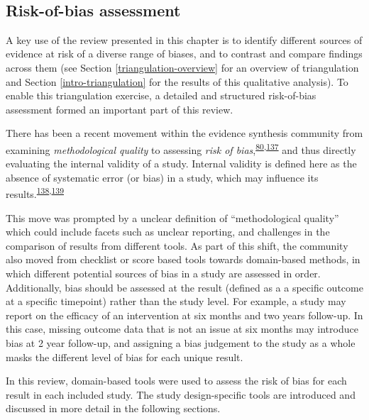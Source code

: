 \documentclass[a4paper, twoside]{templates/ociamthesis}
\begin{document}
~

\hypertarget{risk-of-bias}{%
\subsection{Risk-of-bias assessment}\label{risk-of-bias}}

A key use of the review presented in this chapter is to identify different sources of evidence at risk of a diverse range of biases, and to contrast and compare findings across them (see Section \ref{triangulation-overview} for an overview of triangulation and Section \ref{intro-triangulation} for the results of this qualitative analysis). To enable this triangulation exercise, a detailed and structured risk-of-bias assessment formed an important part of this review.

There has been a recent movement within the evidence synthesis community from examining \emph{methodological quality} to assessing \emph{risk of bias},\textsuperscript{\protect\hyperlink{ref-mcguinness2018}{80},\protect\hyperlink{ref-sterne2016}{137}} and thus directly evaluating the internal validity of a study. Internal validity is defined here as the absence of systematic error (or bias) in a study, which may influence its results.\textsuperscript{\protect\hyperlink{ref-campbell1957}{138},\protect\hyperlink{ref-juni2001}{139}}

This move was prompted by a unclear definition of ``methodological quality'' which could include facets such as unclear reporting, and challenges in the comparison of results from different tools. As part of this shift, the community also moved from checklist or score based tools towards domain-based methods, in which different potential sources of bias in a study are assessed in order. Additionally, bias should be assessed at the result (defined as a a specific outcome at a specific timepoint) rather than the study level. For example, a study may report on the efficacy of an intervention at six months and two years follow-up. In this case, missing outcome data that is not an issue at six months may introduce bias at 2 year follow-up, and assigning a bias judgement to the study as a whole masks the different level of bias for each unique result.

In this review, domain-based tools were used to assess the risk of bias for each result in each included study. The study design-specific tools are introduced and discussed in more detail in the following sections.

~
\end{document}
